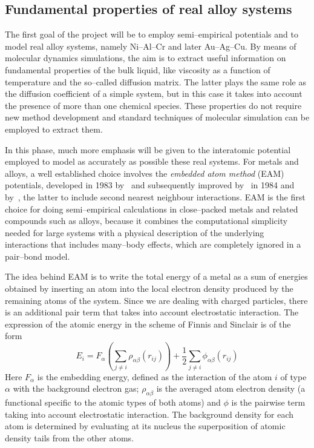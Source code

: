 \subsection{Fundamental properties of real alloy systems}
The first goal of the project will be to employ semi--empirical potentials and to model real alloy systems, namely Ni--Al--Cr and later Au--Ag--Cu. By means of molecular dynamics simulations, the aim is to extract useful information on fundamental properties of the bulk liquid, like viscosity as a function of temperature and the so--called diffusion matrix. The latter plays the same role as the diffusion coefficient of a simple system, but in this case it takes into account the presence of more than one chemical species. These properties do not require new method development and standard techniques of molecular simulation can be employed to extract them.

In this phase, much more emphasis will be given to the interatomic potential employed to model as accurately as possible these real systems. For metals and alloys, a well established choice involves the \textit{embedded atom method} (EAM) potentials, developed in 1983 by~\textcite{Daw1983EAM,Daw1984EAM} and subsequently improved by~\textcite{Finnis1984EAM} in 1984 and by~\textcite{Lee2000}, the latter to include second nearest neighbour interactions. EAM is the first choice for doing semi--empirical calculations in close--packed metals and related compounds such as alloys, because it combines the computational simplicity needed for large systems with a physical description of the underlying interactions that includes many--body effects, which are completely ignored in a pair--bond model.

The idea behind EAM is to write the total energy of a metal as a sum of energies obtained by inserting an atom into the local electron density produced by the remaining atoms of the system. Since we are dealing with charged particles, there is an additional pair term that takes into account electrostatic interaction. The expression of the atomic energy in the scheme of Finnis and Sinclair is of the form
\begin{equation}
    \label{eqn:EAM1}
    E_i= F_\alpha\left(\sum_{j\neq i} \rho_{\alpha\beta} (r_{ij}) \right) + \frac{1}{2} \sum_{j\neq i} \phi_{\alpha\beta}(r_{ij})
\end{equation}
Here $F_\alpha$ is the embedding energy, defined as the interaction of the atom $i$ of type $\alpha$ with the background electron gas; $\rho_{\alpha\beta}$ is the averaged atom electron density (a functional specific to the atomic types of both atoms) and $\phi$ is the pairwise term taking into account electrostatic interaction. The background density for each atom is determined by evaluating at its nucleus the superposition of atomic density tails from the other atoms.

